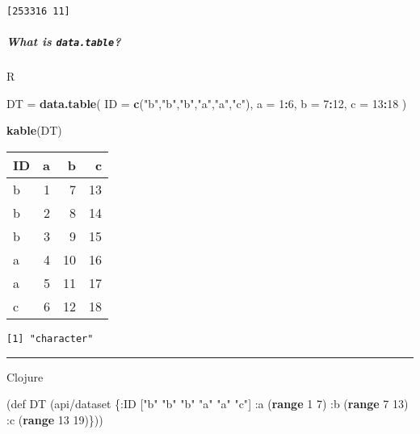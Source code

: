 \documentclass[]{article}
\newenvironment{Shaded}{\begin{snugshade}}{\end{snugshade}}
\newcommand{\KeywordTok}[1]{\textcolor[rgb]{0.13,0.29,0.53}{\textbf{#1}}}
\newcommand{\DataTypeTok}[1]{\textcolor[rgb]{0.13,0.29,0.53}{#1}}
\newcommand{\DecValTok}[1]{\textcolor[rgb]{0.00,0.00,0.81}{#1}}
\newcommand{\StringTok}[1]{\textcolor[rgb]{0.31,0.60,0.02}{#1}}
\newcommand{\FunctionTok}[1]{\textcolor[rgb]{0.00,0.00,0.00}{#1}}
\newcommand{\OperatorTok}[1]{\textcolor[rgb]{0.81,0.36,0.00}{\textbf{#1}}}
\newcommand{\BuiltInTok}[1]{#1}
\newcommand{\AttributeTok}[1]{\textcolor[rgb]{0.77,0.63,0.00}{#1}}
\newcommand{\NormalTok}[1]{#1}
\let\oldsubparagraph\subparagraph
\renewcommand{\subparagraph}[1]{\oldsubparagraph{#1}\mbox{}}
\begin{document}
\begin{verbatim}
[253316 11]
\end{verbatim}

\subparagraph{\texorpdfstring{What is
\texttt{data.table}?}{What is data.table?}}\label{what-is-data.table}

R

\begin{Shaded}
\begin{Highlighting}[]
\NormalTok{DT =}\StringTok{ }\KeywordTok{data.table}\NormalTok{(}
  \DataTypeTok{ID =} \KeywordTok{c}\NormalTok{(}\StringTok{"b"}\NormalTok{,}\StringTok{"b"}\NormalTok{,}\StringTok{"b"}\NormalTok{,}\StringTok{"a"}\NormalTok{,}\StringTok{"a"}\NormalTok{,}\StringTok{"c"}\NormalTok{),}
  \DataTypeTok{a =} \DecValTok{1}\OperatorTok{:}\DecValTok{6}\NormalTok{,}
  \DataTypeTok{b =} \DecValTok{7}\OperatorTok{:}\DecValTok{12}\NormalTok{,}
  \DataTypeTok{c =} \DecValTok{13}\OperatorTok{:}\DecValTok{18}
\NormalTok{)}

\KeywordTok{kable}\NormalTok{(DT)}
\end{Highlighting}
\end{Shaded}

\begin{longtable}[]{@{}lrrr@{}}
\toprule
ID & a & b & c\tabularnewline
\midrule
\endhead
b & 1 & 7 & 13\tabularnewline
b & 2 & 8 & 14\tabularnewline
b & 3 & 9 & 15\tabularnewline
a & 4 & 10 & 16\tabularnewline
a & 5 & 11 & 17\tabularnewline
c & 6 & 12 & 18\tabularnewline
\bottomrule
\end{longtable}

\begin{Shaded}
\end{Shaded}

\begin{verbatim}
[1] "character"
\end{verbatim}

\begin{center}\rule{0.5\linewidth}{0.5pt}\end{center}

Clojure

\begin{Shaded}
\begin{Highlighting}[]
\NormalTok{(}\BuiltInTok{def}\FunctionTok{ DT }\NormalTok{(api/dataset \{}\AttributeTok{:ID}\NormalTok{ [}\StringTok{"b"} \StringTok{"b"} \StringTok{"b"} \StringTok{"a"} \StringTok{"a"} \StringTok{"c"}\NormalTok{]}
                      \AttributeTok{:a}\NormalTok{ (}\KeywordTok{range} \DecValTok{1} \DecValTok{7}\NormalTok{)}
                      \AttributeTok{:b}\NormalTok{ (}\KeywordTok{range} \DecValTok{7} \DecValTok{13}\NormalTok{)}
                      \AttributeTok{:c}\NormalTok{ (}\KeywordTok{range} \DecValTok{13} \DecValTok{19}\NormalTok{)\}))}
\end{Highlighting}
\end{Shaded}
\end{document}
